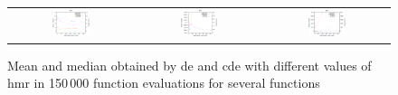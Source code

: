 \documentclass[review,3p]{elsarticle}
\newcommand{\CDE}{c{\sc de}}
\newcommand{\DE}{{\sc de}}
\newcommand{\HMR}{{\sc hmr}}
\begin{document}
\begin{figure}[!t]
\begin{tabular}{ccc}
  \includegraphics[width=0.32\textwidth]{images/HighMutRatio_150000/F17_50_HighMutRatio} & \includegraphics[width=0.32\textwidth]{images/HighMutRatio_150000/F18_50_HighMutRatio} & \includegraphics[width=0.32\textwidth]{images/HighMutRatio_150000/F19_50_HighMutRatio} \\ 
\end{tabular}
\caption{Mean and median obtained by \DE{} and \CDE{} with different values of \HMR{} in 150$\,$000 function evaluations for several functions}
\label{fig:exp1_1}
\end{figure}
\end{document}
